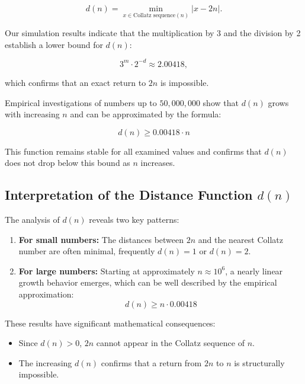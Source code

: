 \documentclass[a4paper,12pt]{article}
\begin{document}
\begin{equation}
    d(n) = \min_{x \in \text{Collatz sequence}(n)} |x - 2n|.
\end{equation}

Our simulation results indicate that the multiplication by 3 and the division by 2 establish a lower bound for \( d(n) \):

\begin{equation}
    3^m \cdot 2^{-d} \approx 2.00418,
\end{equation}

which confirms that an exact return to \( 2n \) is impossible.

Empirical investigations of numbers up to \( 50,000,000 \) show that \( d(n) \) grows with increasing \( n \) and can be approximated by the formula:

\begin{equation}
    d(n) \geq 0.00418 \cdot n
\end{equation}

This function remains stable for all examined values and confirms that \( d(n) \) does not drop below this bound as \( n \) increases.

\subsection{Interpretation of the Distance Function \( d(n) \)}

The analysis of \( d(n) \) reveals two key patterns:

\begin{enumerate}
    \item \textbf{For small numbers:} The distances between \( 2n \) and the nearest Collatz number are often minimal, frequently \( d(n) = 1 \) or \( d(n) = 2 \).
    \item \textbf{For large numbers:} Starting at approximately \( n \approx 10^6 \), a nearly linear growth behavior emerges, which can be well described by the empirical approximation:
    \[
    d(n) \geq n \cdot 0.00418
    \]
\end{enumerate}

These results have significant mathematical consequences:
\begin{itemize}
    \item Since \( d(n) > 0 \), \( 2n \) cannot appear in the Collatz sequence of \( n \).
    \item The increasing \( d(n) \) confirms that a return from \( 2n \) to \( n \) is structurally impossible.
\end{itemize}
\end{document}
